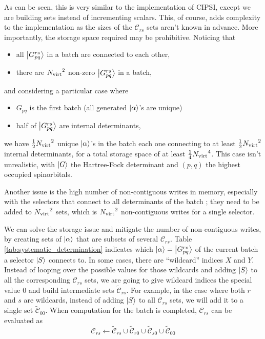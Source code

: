 \documentclass[./thesis.tex]{subfiles}
\begin{document}
As can be seen, this is very similar to the implementation of CIPSI, except we are building sets instead of incrementing scalars. This, of course, adds complexity to the implementation as the sizes of the $\mathcal{C}_{rs}$ sets aren't known in advance.
More importantly, the storage space required may be prohibitive. Noticing that 
\begin{itemize}
\item
all $\ket{G^{rs}_{pq}}$ in a batch are connected to each other,
\item
there are ${{N_\text{virt}}}^2$ non-zero $\ket{G^{rs}_{pq}}$ in a batch,
\end{itemize}
and considering a particular case where
\begin{itemize}
\item
$G_{pq}$ is the first batch (all generated ${\ket{\alpha}}$'s are unique)
\item
half of $\ket{G^{rs}_{pq}}$ are internal determinants,
\end{itemize}
we have $\frac{1}{2}{{N_\text{virt}}}^2$ unique ${\ket{\alpha}}$'s in the batch each one connecting to at least $\frac{1}{2}{{N_\text{virt}}}^2$ internal determinants, for a total storage space of at least $\frac{1}{4}{{N_\text{virt}}}^4$.
This case isn't unrealistic, with $\ket {G}$ the Hartree-Fock determinant and $(p,q)$ the highest occupied spinorbitals.

Another issue is the high number of non-contiguous writes in memory, especially with the selectors that connect to all determinants of the batch ; they need to be added to ${{N_\text{virt}}}^2$ sets, which is ${{N_\text{virt}}}^2$ non-contiguous writes for a single selector.

We can solve the storage issue and mitigate the number of non-contiguous writes, by creating sets of ${\ket{\alpha}}$ that are subsets of several $\mathcal{C}_{rs}$.
Table \ref{tab:systematic_determination} indicates which ${\ket{\alpha}} = \ket {G_{pq}^{rs}}$ of the current batch a selector $\ket{S}$ connects to. In some cases, there are ``wildcard'' indices $X$ and $Y$. Instead of looping over the possible values for those wildcards and adding $\ket{S}$ to all the corresponding $\mathcal{C}_{rs}$ sets, we are going to give wildcard indices the special value $0$ and build intermediate sets $\tilde{\mathcal{C}}_{rs}$. For example, in the case where both $r$ and $s$ are wildcards, instead of adding $\ket{S}$ to all $\mathcal{C}_{rs}$ sets, we will add it to a single set $\tilde{\mathcal{C}}_{00}$. When computation for the batch is completed, $\mathcal{C}_{rs}$ can be evaluated as
\begin{equation}
\mathcal{C}_{rs} \gets \tilde{\mathcal{C}}_{rs} \cup \tilde{\mathcal{C}}_{r0} \cup \tilde{\mathcal{C}}_{s0} \cup \tilde{\mathcal{C}}_{00}
\end{equation}
\end{document}
